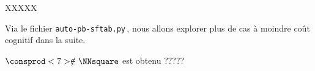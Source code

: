 XXXXX


Via le fichier \verb#auto-pb-sftab.py#\,, nous allons explorer plus de cas à moindre coût cognitif dans la suite.

$\consprod<7> \notin \NNsquare$ est obtenu ?????